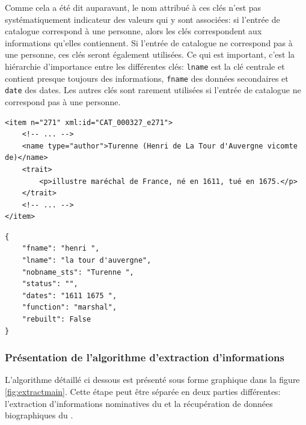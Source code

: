 Comme cela a été dit auparavant, le nom attribué à ces clés n'est pas systématiquement indicateur des valeurs qui y sont associées: si l'entrée de catalogue correspond à une personne, alors les clés correspondent aux informations qu'elles contiennent. Si l'entrée de catalogue ne correspond pas à une personne, ces clés seront également utilisées. Ce qui est important, c'est la hiérarchie d'importance entre les différentes clés: \texttt{lname} est la clé centrale et contient presque toujours des informations, \texttt{fname} des données secondaires et \texttt{date} des dates. Les autres clés sont rarement utilisées si l'entrée de catalogue ne correspond pas à une personne.

\begin{listing}
	\begin{verbatim}
<item n="271" xml:id="CAT_000327_e271">
	<!-- ... -->
	<name type="author">Turenne (Henri de La Tour d'Auvergne vicomte de)</name>
	<trait>
		<p>illustre maréchal de France, né en 1611, tué en 1675.</p>
	</trait>
	<!-- ... -->
</item>
	\end{verbatim}
	\caption{L'entrée \xmltei{} à partir de laquelle des données sont extraites}
	\label{code:prepin}
\end{listing}

\begin{listing}
	\begin{verbatim}
{
	"fname": "henri ", 
	"lname": "la tour d'auvergne", 
	"nobname_sts": "Turenne ", 
	"status": "", 
	"dates": "1611 1675 ", 
	"function": "marshal", 
	"rebuilt": False
}
	\end{verbatim}
	\caption{La sortie \json{} correspondante}
	\label{code:prepout}
\end{listing}

\subsubsection{Présentation de l'algorithme d'extraction d'informations}
L'algorithme détaillé ci dessous est présenté sous forme graphique dans la figure \ref{fig:extractmain}. Cette étape peut être séparée en deux parties différentes: l'extraction d'informations nominatives du \tname{} et la récupération de données biographiques du \ttrait{}.

